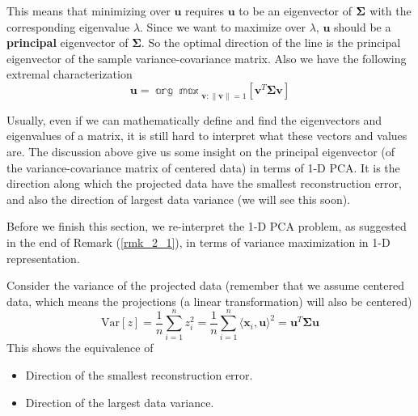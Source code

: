 \documentclass[../main.tex]{subfiles}
\begin{document}
This means that minimizing over $\bm{u}$ requires $\bm{u}$ to be an eigenvector of ${\bf \Sigma}$ with the corresponding eigenvalue $\lambda$. Since we want to maximize over $\lambda$, $\bm{u}$ should be a \textbf{principal} eigenvector of $\bm{\Sigma}$. So the optimal direction of the line is the principal eigenvector of the sample variance-covariance matrix. Also we have the following extremal characterization
\begin{equation*}
\bm{u} = \mathbb{\arg\max}_{\bm{v}:\|\bm{v}\|=1}\left[\bm{v}^T\bm{\Sigma v} \right]
\end{equation*}
\begin{remark}\label{rmk_2_1}
	Usually, even if we can mathematically define and find the eigenvectors and eigenvalues of a matrix, it is still hard to interpret what these vectors and values are. The discussion above give us some insight on the principal eigenvector (of the variance-covariance matrix of centered data) in terms of 1-D PCA. It is the direction along which the projected data have the smallest reconstruction error, and also the direction of largest data variance (we will see this soon).
\end{remark}
\par Before we finish this section, we re-interpret the 1-D PCA problem, as suggested in the end of Remark (\ref{rmk_2_1}), in terms of variance maximization in 1-D representation. 
\par Consider the variance of the projected data (remember that we assume centered data, which means the projections (a linear transformation) will also be centered)
\begin{equation*}
\text{Var}[z]=\frac{1}{n}\sum_{i=1}^{n}z_i^2=\frac{1}{n}\sum_{i=1}^{n}\langle \bm{x}_i,\bm{u}\rangle^2 = \bm{u}^T\bm{\Sigma u}
\end{equation*}
This shows the equivalence of
\begin{itemize}
	\item Direction of the smallest reconstruction error.
	\item Direction of the largest data variance.
\end{itemize}
\end{document}
